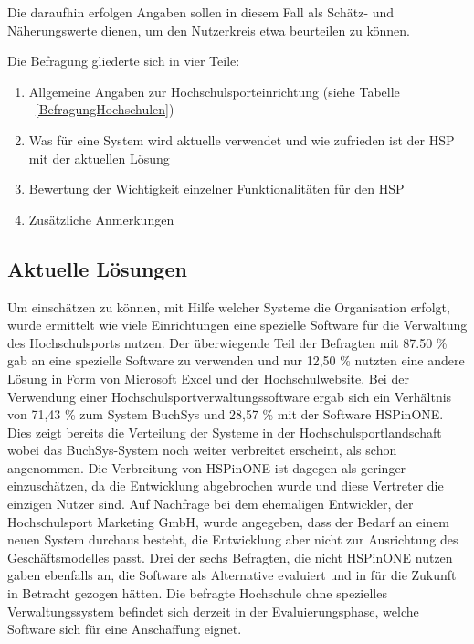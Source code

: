 Die daraufhin erfolgen Angaben sollen in diesem Fall als Schätz- und Näherungswerte dienen, um den Nutzerkreis etwa beurteilen zu können. 

Die Befragung gliederte sich in vier Teile:

\begin{enumerate}
\item Allgemeine Angaben zur Hochschulsporteinrichtung (siehe Tabelle ~\ref{BefragungHochschulen})
\item Was für eine System wird aktuelle verwendet und wie zufrieden ist der HSP mit der aktuellen Lösung
\item Bewertung der Wichtigkeit einzelner Funktionalitäten für den HSP
\item Zusätzliche Anmerkungen
\end{enumerate}

\subsection{Aktuelle Lösungen}
Um einschätzen zu können, mit Hilfe welcher Systeme die Organisation erfolgt, wurde ermittelt wie viele Einrichtungen eine spezielle Software für die Verwaltung des Hochschulsports nutzen. Der überwiegende Teil der Befragten mit 87.50 \% gab an eine spezielle Software zu verwenden und nur 12,50 \% nutzten eine andere Lösung in Form von Microsoft Excel und der Hochschulwebsite. Bei der Verwendung einer Hochschulsportverwaltungssoftware ergab sich ein Verhältnis von 71,43 \% zum System BuchSys und 28,57 \% mit der Software HSPinONE. Dies zeigt bereits die Verteilung der Systeme in der Hochschulsportlandschaft wobei das BuchSys-System noch weiter verbreitet erscheint, als schon angenommen. Die Verbreitung von HSPinONE ist dagegen als geringer einzuschätzen, da die Entwicklung abgebrochen wurde und diese Vertreter die einzigen Nutzer sind. Auf Nachfrage bei dem ehemaligen Entwickler, der Hochschulsport Marketing GmbH, wurde angegeben, dass der Bedarf an einem neuen System durchaus besteht, die Entwicklung aber nicht zur Ausrichtung des Geschäftsmodelles passt. Drei der sechs Befragten, die nicht HSPinONE nutzen gaben ebenfalls an, die Software als Alternative evaluiert und in für die Zukunft in Betracht gezogen hätten. Die befragte Hochschule ohne spezielles Verwaltungssystem befindet sich derzeit in der Evaluierungsphase, welche Software sich für eine Anschaffung eignet.
\\

